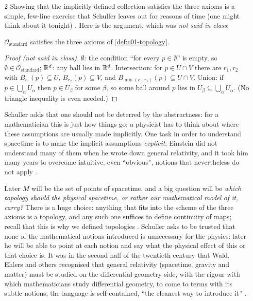 \begin{paracol}{2}
Showing that the implicitly defined collection satisfies the three axioms is a simple, few-line exercise that Schuller leaves out
for reasons of time (one might think about it tonight) . Here is the argument, which was
\emph{not said in class}:
\begin{proposition}\label{prop:c01-std-ok}
$\mathcal O_{\mathrm{standard}}$ satisfies the three axioms of \cref{def:c01-topology}.
\end{proposition}
\begin{proof}[Proof (not said in class)]
$\emptyset$: the condition ``for every $p\in\emptyset$'' is empty, so $\emptyset\in\mathcal O_{\mathrm{standard}}$; $\mathbb{R}^d$: any ball
lies in $\mathbb{R}^d$. Intersection: for $p\in U\cap V$ there are $r_1,r_2$ with $B_{r_1}(p)\subseteq U$, $B_{r_2}(p)\subseteq V$, and
$B_{\min(r_1,r_2)}(p)\subseteq U\cap V$. Union: if $p\in\bigcup_\alpha U_\alpha$ then $p\in U_\beta$ for some $\beta$, so some
ball around $p$ lies in $U_\beta\subseteq\bigcup_\alpha U_\alpha$. (No triangle inequality is even needed.)
\end{proof}

\begin{coursenote}
Schuller adds that one should not be deterred by the abstractness: for a mathematician this is just how things go; a physicist has
to think about where these assumptions are usually made implicitly. One task in order to understand spacetime is to make the
implicit assumptions \emph{explicit}; Einstein did not understand many of them when he wrote down general relativity, and it took
him many years to overcome intuitive, even ``obvious'', notions that nevertheless do not apply .
\end{coursenote}

Later $M$ will be the set of points of spacetime, and a big question will be \emph{which topology should the physical spacetime,
or rather our mathematical model of it, carry?} There is a huge choice: anything that fits into the scheme of the three axioms is a
topology, and any such one suffices to define continuity of maps; recall that this is why we defined topologies
. Schuller asks to be trusted that none of the mathematical notions introduced is
unnecessary for the physics: later he will be able to point at each notion and say what the physical effect of this or that choice
is. It was in the second half of the twentieth century that Wald, Ehlers and others recognised that general relativity (spacetime,
gravity and matter) must be studied on the differential-geometry side, with the rigour with which mathematicians study differential
geometry, to come to terms with its subtle notions; the language is self-contained, ``the cleanest way to introduce it''
.


\end{paracol}

